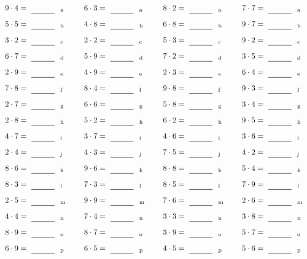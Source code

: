 \documentclass
[
  draft    = true,
  fontsize = 11pt,
  parskip  = half-
]
{scrartcl}
\begin{document}
\par\vfill\par
\begin{align*}
    \pline{9\cdot4}&=\rline{a}
  & \pline{6\cdot3}&=\rline{a}
  & \pline{8\cdot2}&=\rline{a}
  & \pline{7\cdot7}&=\rline{a} \\[1ex]
    \pline{5\cdot5}&=\rline{b}
  & \pline{4\cdot8}&=\rline{b}
  & \pline{6\cdot8}&=\rline{b}
  & \pline{9\cdot7}&=\rline{b} \\[1ex]
    \pline{3\cdot2}&=\rline{c}
  & \pline{2\cdot2}&=\rline{c}
  & \pline{5\cdot3}&=\rline{c}
  & \pline{9\cdot2}&=\rline{c} \\[1ex]
    \pline{6\cdot7}&=\rline{d}
  & \pline{5\cdot9}&=\rline{d}
  & \pline{7\cdot2}&=\rline{d}
  & \pline{3\cdot5}&=\rline{d} \\[1ex]
    \pline{2\cdot9}&=\rline{e}
  & \pline{4\cdot9}&=\rline{e}
  & \pline{2\cdot3}&=\rline{e}
  & \pline{6\cdot4}&=\rline{e} \\[1ex]
    \pline{7\cdot8}&=\rline{f}
  & \pline{8\cdot4}&=\rline{f}
  & \pline{9\cdot8}&=\rline{f}
  & \pline{9\cdot3}&=\rline{f} \\[1ex]
    \pline{2\cdot7}&=\rline{g}
  & \pline{6\cdot6}&=\rline{g}
  & \pline{5\cdot8}&=\rline{g}
  & \pline{3\cdot4}&=\rline{g} \\[1ex]
    \pline{2\cdot8}&=\rline{h}
  & \pline{5\cdot2}&=\rline{h}
  & \pline{6\cdot2}&=\rline{h}
  & \pline{9\cdot5}&=\rline{h} \\[1ex]
    \pline{4\cdot7}&=\rline{i}
  & \pline{3\cdot7}&=\rline{i}
  & \pline{4\cdot6}&=\rline{i}
  & \pline{3\cdot6}&=\rline{i} \\[1ex]
    \pline{2\cdot4}&=\rline{j}
  & \pline{4\cdot3}&=\rline{j}
  & \pline{7\cdot5}&=\rline{j}
  & \pline{4\cdot2}&=\rline{j} \\[1ex]
    \pline{8\cdot6}&=\rline{k}
  & \pline{9\cdot6}&=\rline{k}
  & \pline{8\cdot8}&=\rline{k}
  & \pline{5\cdot4}&=\rline{k} \\[1ex]
    \pline{8\cdot3}&=\rline{l}
  & \pline{7\cdot3}&=\rline{l}
  & \pline{8\cdot5}&=\rline{l}
  & \pline{7\cdot9}&=\rline{l} \\[1ex]
    \pline{2\cdot5}&=\rline{m}
  & \pline{9\cdot9}&=\rline{m}
  & \pline{7\cdot6}&=\rline{m}
  & \pline{2\cdot6}&=\rline{m} \\[1ex]
    \pline{4\cdot4}&=\rline{n}
  & \pline{7\cdot4}&=\rline{n}
  & \pline{3\cdot3}&=\rline{n}
  & \pline{3\cdot8}&=\rline{n} \\[1ex]
    \pline{8\cdot9}&=\rline{o}
  & \pline{8\cdot7}&=\rline{o}
  & \pline{3\cdot9}&=\rline{o}
  & \pline{5\cdot7}&=\rline{o} \\[1ex]
    \pline{6\cdot9}&=\rline{p}
  & \pline{6\cdot5}&=\rline{p}
  & \pline{4\cdot5}&=\rline{p}
  & \pline{5\cdot6}&=\rline{p}
\end{align*}
\end{document}
